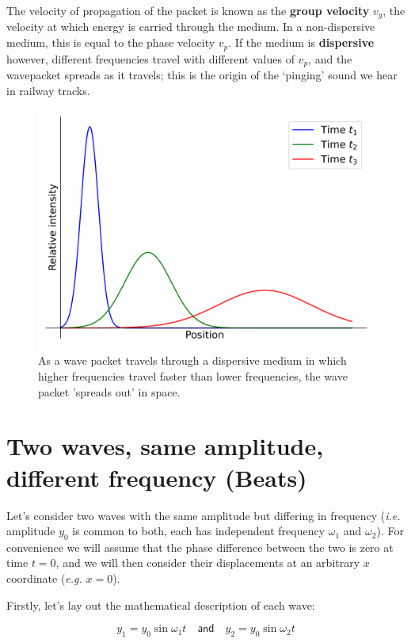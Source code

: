 \documentclass[
]{book}
\begin{document}
The velocity of propagation of the packet is known as the \textbf{group velocity} \(v_g\), the velocity at which energy is carried through the medium. In a non-dispersive medium, this is equal to the phase velocity \(v_p\). If the medium is \textbf{dispersive} however, different frequencies travel with different values of \(v_p\), and the wavepacket spreads as it travels; this is the origin of the `pinging' sound we hear in railway tracks.

\begin{figure}

{\centering \includegraphics[width=0.7\linewidth]{visualisations/ch12-wavepacketdispersion1} 

}

\caption{As a wave packet travels through a dispersive medium in which higher frequencies travel faster than lower frequencies, the wave packet 'spreads out' in space.}\label{fig:ch12-dispersionillustration1}
\end{figure}

\hypertarget{sec-ch12-twowavesbeats1}{%
\section{Two waves, same amplitude, different frequency (Beats)}\label{sec-ch12-twowavesbeats1}}

Let's consider two waves with the same amplitude but differing in frequency (\emph{i.e.} amplitude \(y_0\) is common to both, each has independent frequency \(\omega_1\) and \(\omega_2\)). For convenience we will assume that the phase difference between the two is zero at time \(t=0\), and we will then consider their displacements at an arbitrary \(x\) coordinate (\emph{e.g.} \(x=0\)).

Firstly, let's lay out the mathematical description of each wave:

\begin{equation}
y_{1} = y_{0} \sin \omega_{1} t \quad \textsf{and} \quad y_{2} = y_{0} \sin \omega_{2} t
\label{eq:ch12-addtwowavebeats1}
\end{equation}
\end{document}
